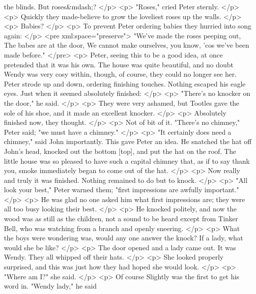       the blinds. But roses&mdash;?
    </p>
    <p>
      "Roses," cried Peter sternly.
    </p>
    <p>
      Quickly they made-believe to grow the loveliest roses up the walls.
    </p>
    <p>
      Babies?
    </p>
    <p>
      To prevent Peter ordering babies they hurried into song again:
    </p>
<pre xml:space="preserve">
     "We've made the roses peeping out,
     The babes are at the door,
     We cannot make ourselves, you know,
     'cos we've been made before."
</pre>
    <p>
      Peter, seeing this to be a good idea, at once pretended that it was his
      own. The house was quite beautiful, and no doubt Wendy was very cosy
      within, though, of course, they could no longer see her. Peter strode up
      and down, ordering finishing touches. Nothing escaped his eagle eyes. Just
      when it seemed absolutely finished:
    </p>
    <p>
      "There's no knocker on the door," he said.
    </p>
    <p>
      They were very ashamed, but Tootles gave the sole of his shoe, and it made
      an excellent knocker.
    </p>
    <p>
      Absolutely finished now, they thought.
    </p>
    <p>
      Not of bit of it. "There's no chimney," Peter said; "we must have a
      chimney."
    </p>
    <p>
      "It certainly does need a chimney," said John importantly. This gave Peter
      an idea. He snatched the hat off John's head, knocked out the bottom
      [top], and put the hat on the roof. The little house was so pleased to
      have such a capital chimney that, as if to say thank you, smoke
      immediately began to come out of the hat.
    </p>
    <p>
      Now really and truly it was finished. Nothing remained to do but to knock.
    </p>
    <p>
      "All look your best," Peter warned them; "first impressions are awfully
      important."
    </p>
    <p>
      He was glad no one asked him what first impressions are; they were all too
      busy looking their best.
    </p>
    <p>
      He knocked politely, and now the wood was as still as the children, not a
      sound to be heard except from Tinker Bell, who was watching from a branch
      and openly sneering.
    </p>
    <p>
      What the boys were wondering was, would any one answer the knock? If a
      lady, what would she be like?
    </p>
    <p>
      The door opened and a lady came out. It was Wendy. They all whipped off
      their hats.
    </p>
    <p>
      She looked properly surprised, and this was just how they had hoped she
      would look.
    </p>
    <p>
      "Where am I?" she said.
    </p>
    <p>
      Of course Slightly was the first to get his word in. "Wendy lady," he said

